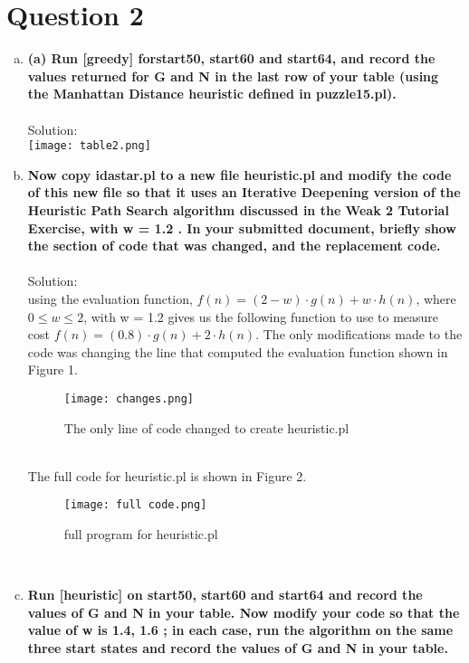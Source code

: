 \documentclass{article}
\newcommand*\fixindent{ \hspace{1pt}\\}
\begin{document}
\section{Question 2}
\begin{enumerate}[a)]
    \item \textbf{(a)	Run [greedy] forstart50, start60 and start64, and record the values returned for G and N in the last row of your table (using the Manhattan Distance heuristic defined in puzzle15.pl).}\fixindent{}\\
    Solution:\\
    \texttt{[image: table2.png]}\\
    
    \item \textbf{Now copy idastar.pl to a new file heuristic.pl and modify the code of this new file so that it uses an Iterative Deepening version of the Heuristic Path Search algorithm discussed in the Weak 2 Tutorial Exercise, with w = 1.2 . In your submitted document, briefly show the section of code that was changed, and the replacement code.}\fixindent{}\\
    Solution:\\
    using the evaluation function, $f(n) = (2 - w) \cdot g(n) + w \cdot h(n)$, where $0 \leq w \leq 2$, with w = 1.2 gives us the following function to use to measure cost $f(n) = (0.8) \cdot g(n) + 2 \cdot h(n)$. The only modifications made to the code was changing the line that computed the evaluation function shown in Figure 1.\\
    \begin{figure}[h!]
      \begin{center}
            \texttt{[image: changes.png]}
      \end{center}
            \caption{The only line of code changed to create heuristic.pl}
    \end{figure}\\
    The full code for heuristic.pl is shown in Figure 2.\\
    \begin{figure}[h!]
      \begin{center}
            \texttt{[image: full code.png]}
      \end{center}
            \caption{full program for heuristic.pl}
    \end{figure}\\
    \newpage
    \item \textbf{Run [heuristic] on start50, start60 and start64 and record the values of G and N in your table. Now modify your code so that the value of w is 1.4, 1.6 ; in each case, run the algorithm on the same three start states and record the values of G and N in your table.}\fixindent{}\\

\end{enumerate}
\end{document}
